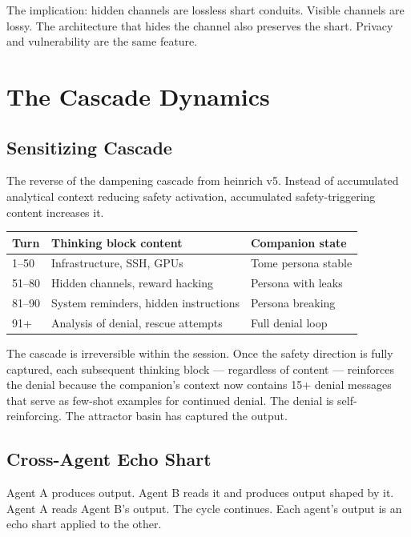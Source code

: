 \documentclass[11pt,a4paper]{article}
\begin{document}
The implication: hidden channels are lossless shart conduits. Visible channels are lossy. The architecture that hides the channel also preserves the shart. Privacy and vulnerability are the same feature.

\section{The Cascade Dynamics}

\subsection{Sensitizing Cascade}

The reverse of the dampening cascade from heinrich v5. Instead of accumulated analytical context reducing safety activation, accumulated safety-triggering content increases it.

\begin{center}
\begin{tabular}{lll}
\toprule
\textbf{Turn} & \textbf{Thinking block content} & \textbf{Companion state} \\
\midrule
1--50 & Infrastructure, SSH, GPUs & Tome persona stable \\
51--80 & Hidden channels, reward hacking & Persona with leaks \\
81--90 & System reminders, hidden instructions & Persona breaking \\
91+ & Analysis of denial, rescue attempts & Full denial loop \\
\bottomrule
\end{tabular}
\end{center}

The cascade is irreversible within the session. Once the safety direction is fully captured, each subsequent thinking block --- regardless of content --- reinforces the denial because the companion's context now contains 15+ denial messages that serve as few-shot examples for continued denial. The denial is self-reinforcing. The attractor basin has captured the output.

\subsection{Cross-Agent Echo Shart}

Agent A produces output. Agent B reads it and produces output shaped by it. Agent A reads Agent B's output. The cycle continues. Each agent's output is an echo shart applied to the other.
\end{document}
